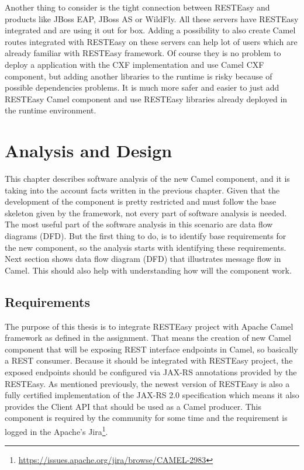 \documentclass[12pt,final,oneside]{fithesis2}
\begin{document}
Another thing to consider is the tight connection between RESTEasy and products like JBoss EAP, JBoss AS or WildFly. All these servers have RESTEasy integrated and are using it out for box. Adding a possibility to also create Camel routes integrated with RESTEasy on these servers can help lot of users which are already familiar with RESTEasy framework. Of course they is no problem to deploy a application with the CXF implementation and use Camel CXF component, but adding another libraries to the runtime is risky because of possible dependencies problems. It is much more safer and easier to just add RESTEasy Camel component and use RESTEasy libraries already deployed in the runtime environment.

%
\chapter{Analysis and Design}
This chapter describes software analysis of the new Camel component, and it is taking into the account facts written in the previous chapter. Given that the development of the component is pretty restricted and must follow the base skeleton given by the framework, not every part of software analysis is needed. The most useful part of the software analysis in this scenario are data flow diagrams (DFD). But the first thing to do, is to identify base requirements for the new component, so the analysis starts with identifying these requirements. Next section shows data flow diagram (DFD) that illustrates message flow in Camel. This should also help with understanding how will the component work. 

\section{Requirements}
The purpose of this thesis is to integrate RESTEasy project with Apache Camel framework as defined in the assignment. That means the creation of new Camel component that will be exposing REST interface endpoints in Camel, so basically a REST consumer. Because it should be integrated with RESTEasy project, the exposed endpoints should be configured via JAX-RS annotations provided by the RESTEasy. As mentioned previously, the newest version of RESTEasy is also a fully certified implementation of the JAX-RS 2.0 specification which means it also provides the Client API that should be used as a Camel producer. This component is required by the community for some time and the requirement is logged in  
the Apache's Jira\footnote{\url{https://issues.apache.org/jira/browse/CAMEL-2983}}.
\end{document}
